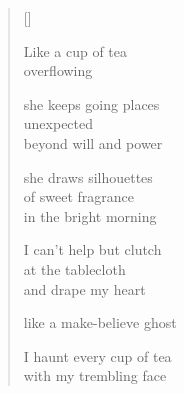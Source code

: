 \documentclass[11pt,a4paper]{article}
\begin{document}
\thispagestyle{empty}

\poemtitle{}

\settowidth{\versewidth}{Like a make-believe ghost}

\bigskip

\begin{verse}[\versewidth]

Like a cup of tea\\
overflowing

she keeps going places\\
unexpected\\
beyond will and power

she draws silhouettes\\
of sweet fragrance\\
in the bright morning

I can't help but clutch\\
at the tablecloth\\
and drape my heart

like a make-believe ghost

I haunt every cup of tea\\
with my trembling face
\end{verse}
\end{document}
